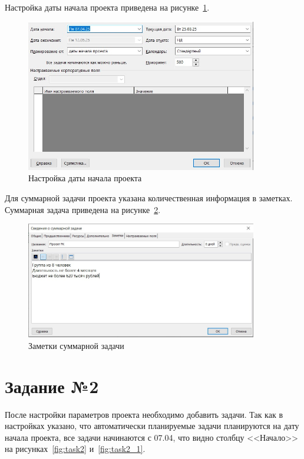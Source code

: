 Настройка даты начала проекта приведена на рисунке~\ref{fig:sum}.

\begin{figure}[H]
	\centering
	\includegraphics[width=0.9\textwidth]{img/task1/screen1_4.jpg}
	\caption{Настройка даты начала проекта}
	\label{fig:sum}
\end{figure}

Для суммарной задачи проекта указана количественная информация в заметках.
Суммарная задача приведена на рисунке~\ref{fig:notes}.

\begin{figure}[H]
	\centering
	\includegraphics[width=0.9\textwidth]{img/task1/screen1_5.jpg}
	\caption{Заметки суммарной задачи}
	\label{fig:notes}
\end{figure}


\section{Задание №2}

После настройки параметров проекта необходимо добавить задачи.
Так как в настройках указано, что автоматически планируемые задачи планируются на дату начала проекта, все задачи начинаются с 07.04, что видно столбцу <<Начало>> на рисунках~\ref{fig:task2} и~\ref{fig:task2_1}.

